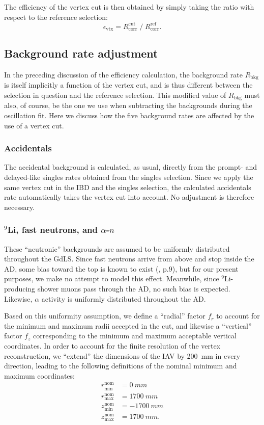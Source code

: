 \documentclass[../thesis.tex]{subfiles}
\begin{document}
The efficiency of the vertex cut is then obtained by simply taking the ratio with respect to the reference selection:
$$ \epsilon_{\mathrm{vtx}} = R_{\mathrm{corr}}^{\mathrm{cut}} \;/\; R_{\mathrm{corr}}^{\mathrm{ref}}. $$

\subsection{Background rate adjustment}
\label{sec:cutVaryVtxCutBkgRate}

In the preceding discussion of the efficiency calculation, the background rate $R_{\mathrm{bkg}}$ is itself implicitly a function of the vertex cut, and is thus different between the selection in question and the reference selection. This modified value of $R_{\mathrm{bkg}}$ must also, of course, be the one we use when subtracting the backgrounds during the oscillation fit. Here we discuss how the five background rates are affected by the use of a vertex cut.

\subsubsection{Accidentals}

The accidental background is calculated, as usual, directly from the prompt- and delayed-like singles rates obtained from the singles selection. Since we apply the same vertex cut in the IBD and the singles selection, the calculated accidentals rate automatically takes the vertex cut into account. No adjustment is therefore necessary.

\subsubsection{$^9$Li, fast neutrons, and $\alpha$-$n$}

These ``neutronic'' backgrounds are assumed to be uniformly distributed throughout the GdLS. Since fast neutrons arrive from above and stop inside the AD, some bias toward the top is known to exist (\cite{jianrunHERA}, p.\@ 9), but for our present purposes, we make no attempt to model this effect. Meanwhile, since $^9$Li-producing shower muons pass through the AD, no such bias is expected. Likewise, $\alpha$ activity is uniformly distributed throughout the AD.

Based on this uniformity assumption, we define a ``radial'' factor $f_r$ to account for the minimum and maximum radii accepted in the cut, and likewise a ``vertical'' factor $f_z$ corresponding to the minimum and maximum acceptable vertical coordinates. In order to account for the finite resolution of the vertex reconstruction, we ``extend'' the dimensions of the IAV by 200~mm in every direction, leading to the following definitions of the nominal minimum and maximum coordinates:
\begin{align*}
  r_{\mathrm{min}}^{\mathrm{nom}} &= \SI{0}{mm}\\
  r_{\mathrm{max}}^{\mathrm{nom}} &= \SI{1700}{mm}\\
  z_{\mathrm{min}}^{\mathrm{nom}} &= \SI{-1700}{mm}\\
  z_{\mathrm{max}}^{\mathrm{nom}} &= \SI{1700}{mm}.
\end{align*}
\end{document}
